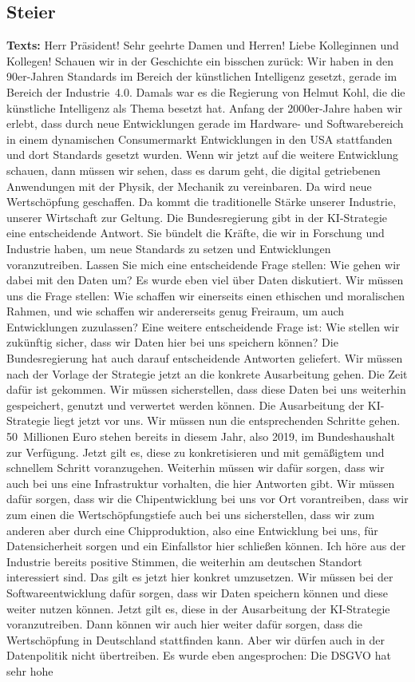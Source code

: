 \documentclass{article}
\begin{document}
\subsection{Steier}
\noindent\textbf{Texts:} Herr Präsident! Sehr geehrte Damen und Herren! Liebe Kolleginnen und Kollegen! Schauen wir in der Geschichte ein bisschen zurück: Wir haben in den 90er-Jahren Standards im Bereich der künstlichen Intelligenz gesetzt, gerade im Bereich der Industrie 4.0. Damals war es die Regierung von Helmut Kohl, die die künstliche Intelligenz als Thema besetzt hat. Anfang der 2000er-Jahre haben wir erlebt, dass durch neue Entwicklungen gerade im Hardware- und Softwarebereich in einem dynamischen Consumermarkt Entwicklungen in den USA stattfanden und dort Standards gesetzt wurden. Wenn wir jetzt auf die weitere Entwicklung schauen, dann müssen wir sehen, dass es darum geht, die digital getriebenen Anwendungen mit der Physik, der Mechanik zu vereinbaren. Da wird neue Wertschöpfung geschaffen. Da kommt die traditionelle Stärke unserer Industrie, unserer Wirtschaft zur Geltung. Die Bundesregierung gibt in der KI-Strategie eine entscheidende Antwort. Sie bündelt die Kräfte, die wir in Forschung und Industrie haben, um neue Standards zu setzen und Entwicklungen voranzutreiben. Lassen Sie mich eine entscheidende Frage stellen: Wie gehen wir dabei mit den Daten um? Es wurde eben viel über Daten diskutiert. Wir müssen uns die Frage stellen: Wie schaffen wir einerseits einen ethischen und moralischen Rahmen, und wie schaffen wir andererseits genug Freiraum, um auch Entwicklungen zuzulassen? Eine weitere entscheidende Frage ist: Wie stellen wir zukünftig sicher, dass wir Daten hier bei uns speichern können? Die Bundesregierung hat auch darauf entscheidende Antworten geliefert. Wir müssen nach der Vorlage der Strategie jetzt an die konkrete Ausarbeitung gehen. Die Zeit dafür ist gekommen. Wir müssen sicherstellen, dass diese Daten bei uns weiterhin gespeichert, genutzt und verwertet werden können.  Die Ausarbeitung der KI-Strategie liegt jetzt vor uns. Wir müssen nun die entsprechenden Schritte gehen. 50 Millionen Euro stehen bereits in diesem Jahr, also 2019, im Bundeshaushalt zur Verfügung. Jetzt gilt es, diese zu konkretisieren und mit gemäßigtem und schnellem Schritt voranzugehen. Weiterhin müssen wir dafür sorgen, dass wir auch bei uns eine Infrastruktur vorhalten, die hier Antworten gibt. Wir müssen dafür sorgen, dass wir die Chipentwicklung bei uns vor Ort vorantreiben, dass wir zum einen die Wertschöpfungstiefe auch bei uns sicherstellen, dass wir zum anderen aber durch eine Chipproduktion, also eine Entwicklung bei uns, für Datensicherheit sorgen und ein Einfallstor hier schließen können. Ich höre aus der Industrie bereits positive Stimmen, die weiterhin am deutschen Standort interessiert sind. Das gilt es jetzt hier konkret umzusetzen.  Wir müssen bei der Softwareentwicklung dafür sorgen, dass wir Daten speichern können und diese weiter nutzen können. Jetzt gilt es, diese in der Ausarbeitung der KI-Strategie voranzutreiben. Dann können wir auch hier weiter dafür sorgen, dass die Wertschöpfung in Deutschland stattfinden kann. Aber wir dürfen auch in der Datenpolitik nicht übertreiben. Es wurde eben angesprochen: Die DSGVO hat sehr hohe 
\end{document}
